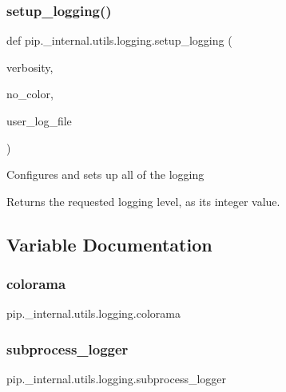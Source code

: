 \subsubsection{\texorpdfstring{setup\+\_\+logging()}{setup\_logging()}}
{\footnotesize\ttfamily def pip.\+\_\+internal.\+utils.\+logging.\+setup\+\_\+logging (\begin{DoxyParamCaption}\item[{}]{verbosity,  }\item[{}]{no\+\_\+color,  }\item[{}]{user\+\_\+log\+\_\+file }\end{DoxyParamCaption})}

\begin{DoxyVerb}Configures and sets up all of the logging

Returns the requested logging level, as its integer value.
\end{DoxyVerb}
 

\subsection{Variable Documentation}
\mbox{\label{namespacepip_1_1__internal_1_1utils_1_1logging_a62d04b07bf9f6eb98b80e144bf0a0360}} 
\subsubsection{\texorpdfstring{colorama}{colorama}}
{\footnotesize\ttfamily pip.\+\_\+internal.\+utils.\+logging.\+colorama}

\mbox{\label{namespacepip_1_1__internal_1_1utils_1_1logging_a32c1d5ed610a13fba36ef4a86f0d8b96}} 
\subsubsection{\texorpdfstring{subprocess\+\_\+logger}{subprocess\_logger}}
{\footnotesize\ttfamily pip.\+\_\+internal.\+utils.\+logging.\+subprocess\+\_\+logger}

